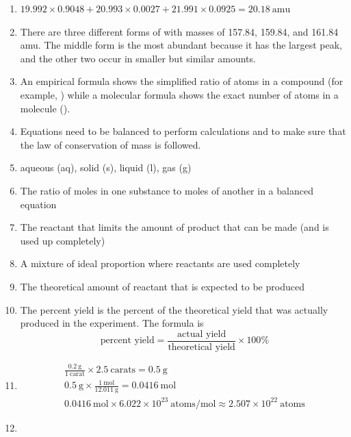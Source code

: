 \documentclass[a4paper, 12pt]{article}
\newcommand{\lab}[1]{\: \text{#1}}
\begin{document}
\begin{enumerate}[label=\alph*.]
\item 
$19.992 \times 0.9048 + 20.993 \times 0.0027 + 21.991 \times   0.0925 = 20.18 \lab{amu}$
\item There are three different forms of  with masses of 157.84, 159.84, and 161.84 amu. The middle form is the most abundant because it has the largest peak, and the other two occur in smaller but similar amounts. 
\item An empirical formula shows the simplified ratio of atoms in a compound (for example, ) while a molecular formula shows the exact number of atoms in a molecule (). 
\item Equations need to be balanced to perform calculations and to make sure that the law of conservation of mass is followed.
\item aqueous (aq), solid (s), liquid (l), gas (g)
\item The ratio of moles in one substance to moles of another in a balanced equation
\item The reactant that limits the amount of product that can be made (and is used up completely)
\item A mixture of ideal proportion where reactants are used completely
\item The theoretical amount of reactant that is expected to be produced
\item The percent yield is the percent of the theoretical yield that was actually produced in the experiment. The formula is 
$$ \text{percent yield} = \frac{\text{actual yield}}{\text{theoretical yield}} \times 100\% $$
\item
\begin{gather*}
\frac{0.2 \lab{g}}{1 \lab{carat}} \times 2.5 \lab{carats} = 0.5 \lab{g} \\
0.5 \lab{g} \times \frac{1 \lab{mol}}{12.011 \lab{g}} = 0.0416 \lab{mol} \\
0.0416 \lab{mol} \times 6.022 \times 10^{23} \lab{atoms/mol} \approx \boxed{2.507 \times 10^{22} \lab{atoms}}
\end{gather*}
\item


\end{enumerate}
\end{document}
